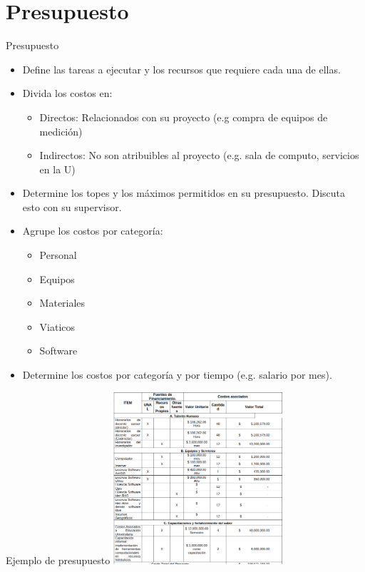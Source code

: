 \documentclass[
10pt,
aspectratio=169,
]{beamer}
\begin{document}
\section{Presupuesto}
\begin{frame}{Presupuesto}
\begin{itemize}
\item Define las tareas a ejecutar y los recursos que requiere cada una de ellas. 
\item Divida los costos en:
\begin{itemize}
\item Directos: Relacionados con su proyecto (e.g compra de equipos de medición)
\item Indirectos: No son atribuibles al proyecto (e.g. sala de computo, servicios en la U) 
\end{itemize}
\item Determine los topes y los máximos permitidos en su presupuesto. Discuta esto con su supervisor.
\item Agrupe los costos por categoría:
\begin{itemize}
\item Personal
\item Equipos
\item Materiales
\item Viaticos
\item Software
\end{itemize}
\item Determine los costos por categoría y por tiempo (e.g. salario por mes).
\end{itemize}
\end{frame}


\begin{frame}{Ejemplo de presupuesto}
\centering
\includegraphics[width=0.47\textwidth]{f4prog.png}
\end{frame}
\end{document}

